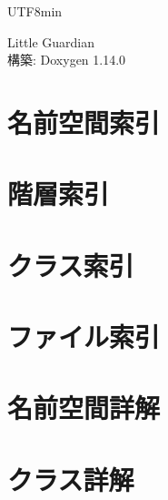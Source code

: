 \documentclass[twoside]{book}
\newcommand{\+}{\discretionary{\mbox{\scriptsize$\hookleftarrow$}}{}{}}
\newcommand{\clearemptydoublepage}{%
    \newpage{\pagestyle{empty}\cleardoublepage}%
  }
\begin{document}
  \raggedbottom
  \begin{CJK}{UTF8}{min}
    \hypersetup{pageanchor=false,
                bookmarksnumbered=true,
                pdfencoding=unicode
               }
  \begin{titlepage}
  \vspace*{7cm}
  \begin{center}%
  {\Large Little Guardian}\\
  \vspace*{1cm}
  {\large 構築\+: Doxygen 1.14.0}\\
  \end{center}
  \end{titlepage}
  \clearemptydoublepage
  \tableofcontents
  \clearemptydoublepage
  \hypersetup{pageanchor=true}
\chapter{名前空間索引}

\chapter{階層索引}

\chapter{クラス索引}

\chapter{ファイル索引}

\chapter{名前空間詳解}

\chapter{クラス詳解}





















\end{CJK}
\end{document}
